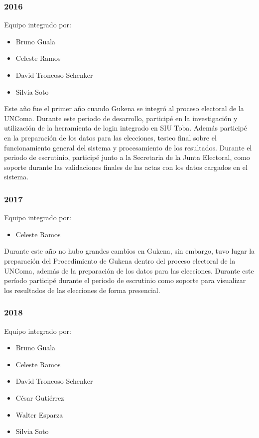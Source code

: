 \subsubsection{2016}
Equipo integrado por:
\begin{itemize}
    \item Bruno Guala
    \item Celeste Ramos
    \item David Troncoso Schenker
    \item Silvia Soto
\end{itemize}

Este año fue el primer año cuando Gukena se integró al proceso electoral de la UNComa. Durante este periodo de desarrollo, participé en la investigación y utilización de la herramienta de login integrado en SIU Toba. Además participé en la preparación de los datos para las elecciones, testeo final sobre el funcionamiento general del sistema y procesamiento de los resultados. Durante el periodo de escrutinio, participé junto a la Secretaria de la Junta Electoral, como soporte durante las validaciones finales de las actas con los datos cargados en el sistema.

\subsubsection{2017}
Equipo integrado por:
\begin{itemize}
    \item Celeste Ramos
\end{itemize}

Durante este año no hubo grandes cambios en Gukena, sin embargo, tuvo lugar la preparación del Procedimiento de Gukena dentro del proceso electoral de la UNComa, además de la preparación de los datos para las elecciones. Durante este período participé durante el periodo de escrutinio como soporte para visualizar los resultados de las elecciones de forma presencial.

\subsubsection{2018}
Equipo integrado por:
\begin{itemize}
    \item Bruno Guala
    \item Celeste Ramos
    \item David Troncoso Schenker
    \item César Gutiérrez 
    \item Walter Esparza 
    \item Silvia Soto
\end{itemize}

